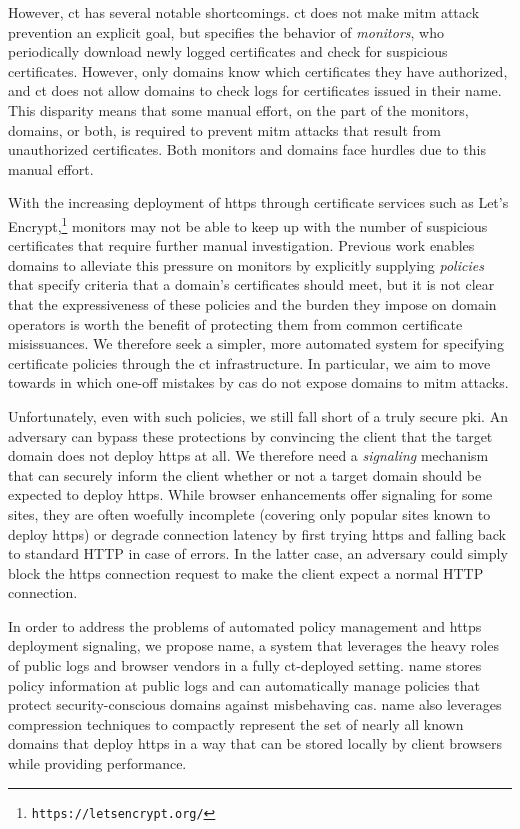 However, \ac{ct} has several notable shortcomings. \ac{ct} does not make
\ac{mitm} attack prevention an explicit goal, but specifies the behavior of
\emph{monitors}, who periodically download newly logged certificates and check
for suspicious certificates. However, only domains know which certificates they
have authorized, and \ac{ct} does not allow domains to check logs for
certificates issued in their name. This disparity means that some manual effort,
on the part of the monitors, domains, or both, is required to prevent \ac{mitm}
attacks that result from unauthorized certificates. Both monitors and domains
face hurdles due to this manual effort.

With the increasing deployment of \ac{https} through certificate services such
as Let's Encrypt,\footnote{\texttt{https://letsencrypt.org/}} monitors may not
be able to keep up with the number of suspicious certificates that require
further manual investigation. Previous work enables domains to alleviate this
pressure on monitors by explicitly supplying \emph{policies} that specify
criteria that a domain's certificates should meet, but it is not clear that the
expressiveness of these policies and the burden they impose on domain operators
is worth the benefit of protecting them from common certificate misissuances. We
therefore seek a simpler, more automated system for specifying certificate
policies through the \ac{ct} infrastructure. In particular, we aim to move
towards  in which one-off mistakes by \acp{ca} do not expose domains to
\ac{mitm} attacks.

Unfortunately, even with such policies, we still fall short of a truly secure
\ac{pki}. An adversary can bypass these protections by convincing the client
that the target domain does not deploy \ac{https} at all. We therefore need a
\emph{signaling} mechanism that can securely inform the client whether or not a
target domain should be expected to deploy \ac{https}. While browser
enhancements offer signaling for some sites, they are often woefully incomplete
(covering only popular sites known to deploy \ac{https}) or degrade connection
latency by first trying \ac{https} and falling back to standard HTTP in case of
errors. In the latter case, an adversary could simply block the \ac{https}
connection request to make the client expect a normal HTTP connection.

In order to address the problems of automated policy management and \ac{https}
deployment signaling, we propose \ac{name}, a system that leverages the heavy
roles of public logs and browser vendors in a fully \ac{ct}-deployed setting.
\ac{name} stores policy information at public logs and can automatically manage
policies that protect security-conscious domains against misbehaving \acp{ca}.
\ac{name} also leverages compression techniques to compactly represent the set
of nearly all known domains that deploy \ac{https} in a way that can be stored
locally by client browsers while providing  performance.

